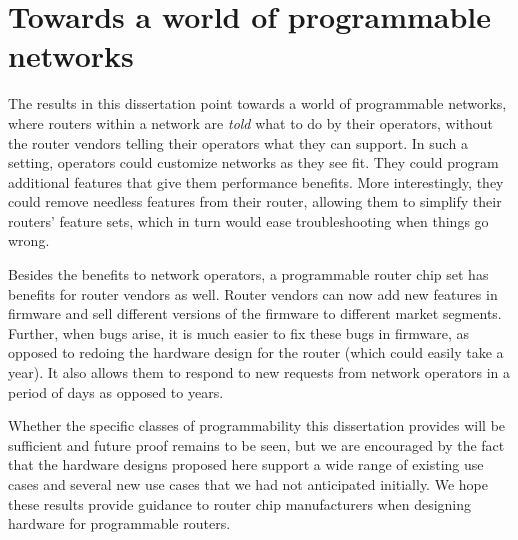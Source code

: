 \section{Towards a world of programmable networks}

The results in this dissertation point towards a world of programmable
networks, where routers within a network are \textit{told} what to do by their
operators, without the router vendors telling their operators what they can
support. In such a setting, operators could customize networks as they see fit.
They could program additional features that give them performance benefits.
More interestingly, they could remove needless features from their router,
allowing them to simplify their routers' feature sets, which in turn would ease
troubleshooting when things go wrong.

Besides the benefits to network operators, a programmable router chip set has
benefits for router vendors as well. Router vendors can now add new features in
firmware and sell different versions of the firmware to different market
segments. Further, when bugs arise, it is much easier to fix these bugs in
firmware, as opposed to redoing the hardware design for the router (which could
easily take a year). It also allows them to respond to new requests from
network operators in a period of days as opposed to years.

Whether the specific classes of programmability this dissertation provides will
be sufficient and future proof remains to be seen, but we are encouraged by the
fact that the hardware designs proposed here support a wide range of existing
use cases and several new use cases that we had not anticipated initially. We
hope these results provide guidance to router chip manufacturers when designing
hardware for programmable routers.

